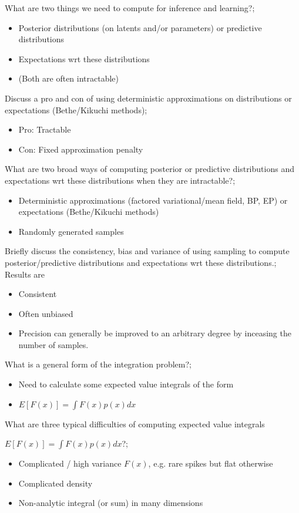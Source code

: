\documentclass{article}
\begin{document}
What are two things we need to compute for inference and learning?; \begin{itemize}
    \item Posterior distributions (on latents and/or parameters) or predictive distributions
    \item Expectations wrt these distributions
    \item (Both are often intractable)
\end{itemize}

Discuss a pro and con of using deterministic approximations on distributions or expectations (Bethe/Kikuchi methods); \begin{itemize}
    \item Pro: Tractable
    \item Con: Fixed approximation penalty
\end{itemize}

What are two broad ways of computing posterior or predictive distributions and expectations wrt these distributions when they are intractable?; \begin{itemize}
    \item Deterministic approximations (factored variational/mean field, BP, EP) or expectations (Bethe/Kikuchi methods)
    \item Randomly generated samples
\end{itemize}

Briefly discuss the consistency, bias and variance of using sampling to compute posterior/predictive distributions and expectations wrt these distributions.; Results are \begin{itemize}
    \item Consistent
    \item Often unbiased
    \item Precision can generally be improved to an arbitrary degree by inceasing the number of samples.
\end{itemize}


What is a general form of the integration problem?; \begin{itemize}
    \item Need to calculate some expected value integrals of the form
    \item $E[F(x)] = \int F(x)p(x)dx$
\end{itemize}

What are three typical difficulties of computing expected value integrals \item $E[F(x)] = \int F(x)p(x)dx$?; \begin{itemize}
    \item Complicated / high variance $F(x)$, e.g. rare spikes but flat otherwise
    \item Complicated density
    \item Non-analytic integral (or sum) in many dimensions
\end{itemize}
\end{document}
